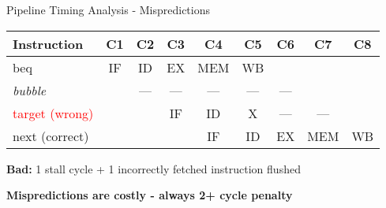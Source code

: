 \documentclass[aspectratio=169,12pt]{beamer}
\begin{document}
\begin{frame}{Pipeline Timing Analysis - Mispredictions}
\begin{center}
{\begin{minipage}{0.95\textwidth}
\begin{tabular}{l|c|c|c|c|c|c|c|c}
\textbf{Instruction} & \textbf{C1} & \textbf{C2} & \textbf{C3} & \textbf{C4} & \textbf{C5} & \textbf{C6} & \textbf{C7} & \textbf{C8} \\
\hline
beq & \cellcolor{normalexec!40}IF & \cellcolor{normalexec!40}ID & \cellcolor{normalexec!40}EX & \cellcolor{normalexec!40}MEM & \cellcolor{normalexec!40}WB & & & \\
\textit{bubble} & & \cellcolor{stallcolor!40}--- & \cellcolor{emptycolor}--- & \cellcolor{emptycolor}--- & \cellcolor{emptycolor}--- & \cellcolor{emptycolor}--- & & \\
\textcolor{red}{target (wrong)} & & & \cellcolor{normalexec!40}IF & \cellcolor{flushcolor!40}ID & \cellcolor{flushcolor!40}\textsf{X} & \cellcolor{emptycolor}--- & \cellcolor{emptycolor}--- & \\
next (correct) & & & & \cellcolor{normalexec!40}IF & \cellcolor{normalexec!40}ID & \cellcolor{normalexec!40}EX & \cellcolor{normalexec!40}MEM & \cellcolor{normalexec!40}WB \\
\end{tabular}

\vspace{0.05cm}
\footnotesize \textbf{Bad:} 1 stall cycle + 1 incorrectly fetched instruction flushed
\end{minipage}
}
\end{center}

\vspace{0.3cm}


\begin{center}
\large
\textcolor{red!70!black}{\textbf{Mispredictions are costly - always 2+ cycle penalty}}
\end{center}

\end{frame}
\end{document}
